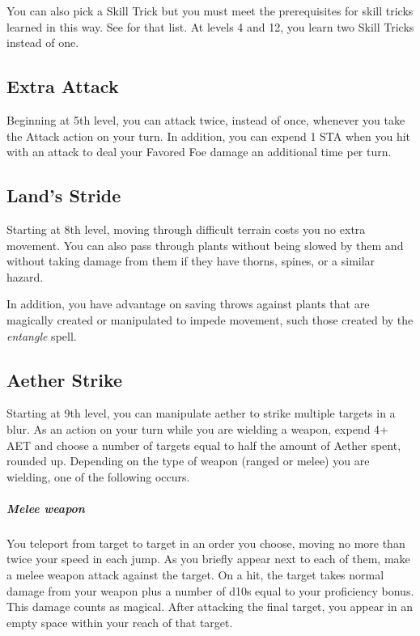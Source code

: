 You can also pick a Skill Trick but you must meet the prerequisites for skill tricks learned in this way. See  for that list. At levels 4 and 12, you learn two Skill Tricks instead of one.

\subsection{Extra Attack}

Beginning at 5th level, you can attack twice, instead of once, whenever you take the Attack action on your turn. In addition, you can expend 1 STA when you hit with an attack to deal your Favored Foe damage an additional time per turn. 

\subsection{Land's Stride}

Starting at 8th level, moving through difficult terrain costs you no extra movement. You can also pass through plants without being slowed by them and without taking damage from them if they have thorns, spines, or a similar hazard.

In addition, you have advantage on saving throws against plants that are magically created or manipulated to impede movement, such those created by the \textit{entangle} spell.

\subsection{Aether Strike}

Starting at 9th level, you can manipulate aether to strike multiple targets in a blur. As an action on your turn while you are wielding a weapon, expend 4+ AET and choose a number of targets equal to half the amount of Aether spent, rounded up. Depending on the type of weapon (ranged or melee) you are wielding, one of the following occurs.

\subparagraph*{Melee weapon} You teleport from target to target in an order you choose, moving no more than twice your speed in each jump. As you briefly appear next to each of them, make a melee weapon attack against the target. On a hit, the target takes normal damage from your weapon plus a number of d10s equal to your proficiency bonus. This damage counts as magical. After attacking the final target, you appear in an empty space within your reach of that target.


